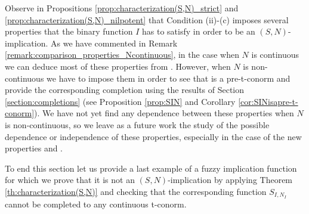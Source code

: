 \begin{remark} Observe in Propositions \ref{prop:characterization(S,N)_strict} and \ref{prop:characterization(S,N)_nilpotent} that Condition (ii)-(c) imposes several properties that the binary function $I$ has to satisfy in order to be an $(S,N)$-implication. As we have commented in Remark \ref{remark:comparison_properties_Ncontinuous}, in the case when $N$ is continuous we can deduce most of these properties from \EP. However, when $N$ is non-continuous we have to impose them in order to see that \SIN is a pre-t-conorm and provide the corresponding completion using the results of Section \ref{section:completions} (see Proposition \ref{prop:SIN} and Corollary \ref{cor:SINisapre-t-conorm}). We have not yet find any dependence between these properties when $N$ is non-continuous, so we leave as a future work the study of the possible dependence or independence of these properties, especially in the case of the new properties \Rone and \Rtwo.
\end{remark}

To end this section let us provide a last example of a fuzzy implication function for which we prove that it is not an $(S,N)$-implication by applying Theorem \ref{th:characterization(S,N)} and checking that the corresponding function $S_{I,N_I}$ cannot be completed to any continuous t-conorm.

